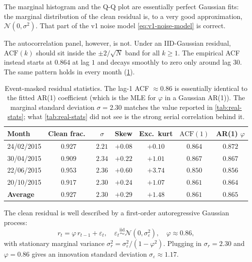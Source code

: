 The marginal histogram and the Q-Q plot are essentially perfect
Gaussian fits: the marginal distribution of the clean residual is, to
a very good approximation, $\mathcal{N}(0, \sigma^2)$. That part of
the v1 noise model \cref{eq:v1-noise-model} is correct.

The autocorrelation panel, however, is not. Under an IID-Gaussian
residual, $\mathrm{ACF}(k)$ should sit inside the $\pm 2 / \sqrt{N}$
band for all $k \geq 1$. The empirical ACF instead starts at $0.864$
at lag $1$ and decays smoothly to zero only around lag $30$. The same
pattern holds in every month
(\cref{tab:reanal-noise}).

\begin{table}[H]
    \centering
    \footnotesize
    \begin{tabular}{lcccccc}
        \toprule
        Month & Clean frac.\ & $\sigma$ & Skew & Exc.\ kurt &
        $\mathrm{ACF}(1)$ & AR(1) $\varphi$ \\
        \midrule
        24/02/2015 & $0.927$ & $2.21$ & $+0.08$ & $+0.10$ & $0.864$ & $0.872$ \\
        30/04/2015 & $0.909$ & $2.34$ & $+0.22$ & $+1.01$ & $0.867$ & $0.867$ \\
        22/06/2015 & $0.953$ & $2.36$ & $+0.60$ & $+3.74$ & $0.850$ & $0.856$ \\
        20/10/2015 & $0.917$ & $2.30$ & $+0.24$ & $+1.07$ & $0.861$ & $0.864$ \\
        \midrule
        \textbf{Average} & $0.927$ & $2.30$ & $+0.29$ & $+1.48$ &
        $\mathbf{0.861}$ & $\mathbf{0.865}$ \\
        \bottomrule
    \end{tabular}
    \caption{Event-masked residual statistics. The lag-1 ACF $\approx
    0.86$ is essentially identical to the fitted AR(1) coefficient
    (which is the MLE for $\varphi$ in a Gaussian AR(1)). The marginal
    standard deviation $\sigma = 2.30$ matches the value reported in
    \cref{tab:real-stats}; what \cref{tab:real-stats} did not see is
    the strong serial correlation behind it.}
    \label{tab:reanal-noise}
\end{table}

The clean residual is well described by a first-order autoregressive
Gaussian process:
\begin{equation}
    r_t = \varphi\, r_{t-1} + \varepsilon_t,
    \quad \varepsilon_t \overset{\text{iid}}{\sim}
        \mathcal{N}(0, \sigma_\varepsilon^2),
    \quad \varphi \approx 0.86,
    \label{eq:ar1-noise}
\end{equation}
with stationary marginal variance
$\sigma_r^2 = \sigma_\varepsilon^2 / (1 - \varphi^2)$. Plugging in
$\sigma_r = 2.30$ and $\varphi = 0.86$ gives an innovation standard
deviation $\sigma_\varepsilon \approx 1.17$.

